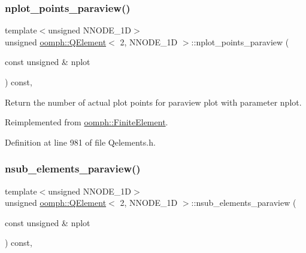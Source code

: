 \subsubsection{\texorpdfstring{nplot\+\_\+points\+\_\+paraview()}{nplot\_points\_paraview()}}
{\footnotesize\ttfamily template$<$unsigned N\+N\+O\+D\+E\+\_\+1D$>$ \\
unsigned \hyperlink{classoomph_1_1QElement}{oomph\+::\+Q\+Element}$<$ 2, N\+N\+O\+D\+E\+\_\+1D $>$\+::nplot\+\_\+points\+\_\+paraview (\begin{DoxyParamCaption}\item[{const unsigned \&}]{nplot }\end{DoxyParamCaption}) const\hspace{0.3cm}{\ttfamily [inline]}, {\ttfamily [virtual]}}



Return the number of actual plot points for paraview plot with parameter nplot. 



Reimplemented from \hyperlink{classoomph_1_1FiniteElement_a06d32c85753a1e302c3b345ea27f6c85}{oomph\+::\+Finite\+Element}.



Definition at line 981 of file Qelements.\+h.

\mbox{\label{classoomph_1_1QElement_3_012_00_01NNODE__1D_01_4_ac7722f592ea96f7f1fc9b9de71fba1cb}} 
\subsubsection{\texorpdfstring{nsub\+\_\+elements\+\_\+paraview()}{nsub\_elements\_paraview()}}
{\footnotesize\ttfamily template$<$unsigned N\+N\+O\+D\+E\+\_\+1D$>$ \\
unsigned \hyperlink{classoomph_1_1QElement}{oomph\+::\+Q\+Element}$<$ 2, N\+N\+O\+D\+E\+\_\+1D $>$\+::nsub\+\_\+elements\+\_\+paraview (\begin{DoxyParamCaption}\item[{const unsigned \&}]{nplot }\end{DoxyParamCaption}) const\hspace{0.3cm}{\ttfamily [inline]}, {\ttfamily [virtual]}}



